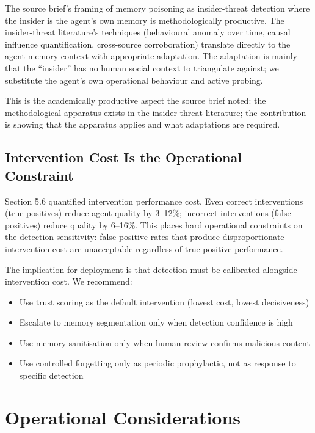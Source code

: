 \documentclass[sigconf,nonacm]{acmart}
\begin{document}
The source brief's framing of memory poisoning as insider-threat
detection where the insider is the agent's own memory is
methodologically productive. The insider-threat literature's
techniques (behavioural anomaly over time, causal influence
quantification, cross-source corroboration) translate directly
to the agent-memory context with appropriate adaptation. The
adaptation is mainly that the ``insider'' has no human social
context to triangulate against; we substitute the agent's own
operational behaviour and active probing.

This is the academically productive aspect the source brief noted:
the methodological apparatus exists in the insider-threat
literature; the contribution is showing that the apparatus
applies and what adaptations are required.

\subsection{Intervention Cost Is the Operational Constraint}

Section 5.6 quantified intervention performance cost. Even
correct interventions (true positives) reduce agent quality by
3--12\%; incorrect interventions (false positives) reduce quality
by 6--16\%. This places hard operational constraints on the
detection sensitivity: false-positive rates that produce
disproportionate intervention cost are unacceptable regardless
of true-positive performance.

The implication for deployment is that detection must be
calibrated alongside intervention cost. We recommend:

\begin{itemize}
  \item Use trust scoring as the default intervention (lowest
        cost, lowest decisiveness)
  \item Escalate to memory segmentation only when detection
        confidence is high
  \item Use memory sanitisation only when human review confirms
        malicious content
  \item Use controlled forgetting only as periodic prophylactic,
        not as response to specific detection
\end{itemize}

\section{Operational Considerations}
\end{document}
